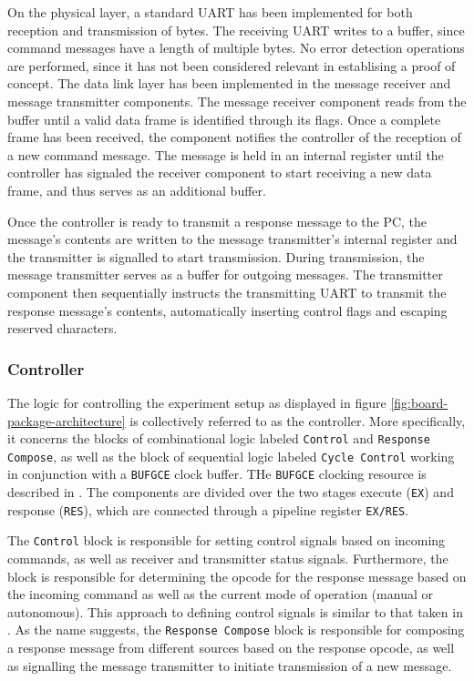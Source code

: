 \documentclass[main.tex]{subfiles}
\begin{document}
On the physical layer, a standard UART has been implemented for both reception and transmission of bytes. The receiving UART writes to a buffer, since command messages have a length of multiple bytes. No error detection operations are performed, since it has not been considered relevant in establising a proof of concept. The data link layer has been implemented in the message receiver and message transmitter components. The message receiver component reads from the buffer until a valid data frame is identified through its flags. Once a complete frame has been received, the component notifies the controller of the reception of a new command message. The message is held in an internal register until the controller has signaled the receiver component to start receiving a new data frame, and thus serves as an additional buffer. 

Once the controller is ready to transmit a response message to the PC, the message's contents are written to the message transmitter's internal register and the transmitter is signalled to start transmission. During transmission, the message transmitter serves as a buffer for outgoing messages. The transmitter component then sequentially instructs the transmitting UART to transmit the response message's contents, automatically inserting control flags and escaping reserved characters. 

\subsubsection{Controller}
The logic for controlling the experiment setup as displayed in figure \ref{fig:board-package-architecture} is collectively referred to as the controller. More specifically, it concerns the blocks of combinational logic labeled \texttt{Control} and \texttt{Response Compose}, as well as the block of sequential logic labeled \texttt{Cycle Control} working in conjunction with a \texttt{BUFGCE} clock buffer. THe \texttt{BUFGCE} clocking resource is described in \cite[p.40]{ug472}. The components are divided over the two stages execute (\texttt{EX}) and response (\texttt{RES}), which are connected through a pipeline register \texttt{EX/RES}.

The \texttt{Control} block is responsible for setting control signals based on incoming commands, as well as receiver and transmitter status signals. Furthermore, the block is responsible for determining the opcode for the response message based on the incoming command as well as the current mode of operation (manual or autonomous). This approach to defining control signals is similar to that taken in \cite[Ch.4]{hennessy2013computer}. As the name suggests, the \texttt{Response Compose} block is responsible for composing a response message from different sources based on the response opcode, as well as signalling the message transmitter to initiate transmission of a new message.
\end{document}
